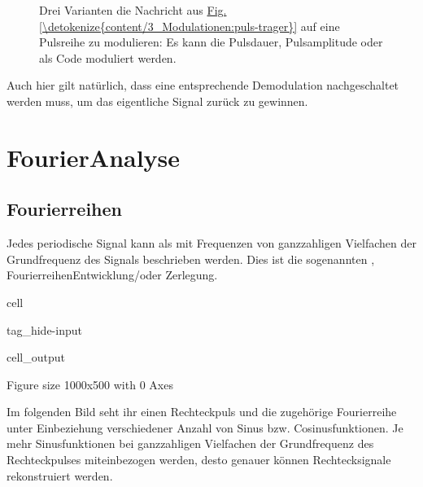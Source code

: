 \documentclass[letterpaper,10pt,english]{jupyterBook}
\let\sphinxpxdimen\pdfpxdimen\else\newdimen\sphinxpxdimen
\begin{document}
\begin{figure}[htbp]
\centering
\capstart

\noindent\sphinxincludegraphics[width=900\sphinxpxdimen]{{pulsmod}.jpg}
\caption{Drei Varianten die Nachricht aus \hyperref[\detokenize{content/3_Modulationen:puls-trager}]{Fig.\@ \ref{\detokenize{content/3_Modulationen:puls-trager}}} auf eine Pulsreihe zu modulieren: Es kann die Pulsdauer, Pulsamplitude oder als Code moduliert werden.}\label{\detokenize{content/3_Modulationen:pulsmod}}\end{figure}

\sphinxAtStartPar
Auch hier gilt natürlich, dass eine entsprechende Demodulation nachgeschaltet werden muss, um das eigentliche Signal zurück zu gewinnen.

\sphinxstepscope


\section{Fourier\sphinxhyphen{}Analyse}
\label{\detokenize{content/3_FourierAnalyse:fourier-analyse}}\label{\detokenize{content/3_FourierAnalyse::doc}}

\subsection{Fourierreihen}
\label{\detokenize{content/3_FourierAnalyse:fourierreihen}}
\sphinxAtStartPar
Jedes periodische Signal kann als  mit Frequenzen von ganzzahligen Vielfachen der Grundfrequenz des Signals beschrieben werden. Dies ist die sogenannten , Fourierreihen\sphinxhyphen{}Entwicklung/oder \sphinxhyphen{}Zerlegung.

\begin{sphinxuseclass}{cell}
\begin{sphinxuseclass}{tag_hide-input}\begin{sphinxVerbatimOutput}

\begin{sphinxuseclass}{cell_output}
\begin{sphinxVerbatim}[commandchars=\\\{\}]
\PYGZlt{}Figure size 1000x500 with 0 Axes\PYGZgt{}
\end{sphinxVerbatim}

\noindent{}

\end{sphinxuseclass}\end{sphinxVerbatimOutput}

\end{sphinxuseclass}
\end{sphinxuseclass}
\sphinxAtStartPar
Im folgenden Bild seht ihr einen Rechteckpuls und die zugehörige Fourierreihe unter Einbeziehung verschiedener Anzahl von Sinus\sphinxhyphen{} bzw. Cosinusfunktionen. Je mehr Sinusfunktionen bei ganzzahligen Vielfachen der Grundfrequenz des Rechteckpulses miteinbezogen werden, desto genauer können Rechtecksignale rekonstruiert werden.
\end{document}
